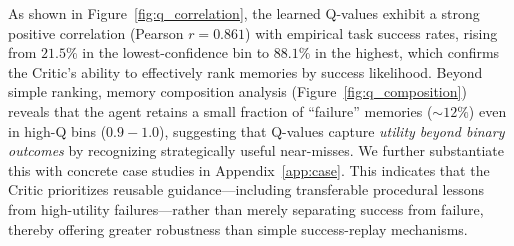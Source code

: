 \documentclass{article}
\theoremstyle{plain}
\theoremstyle{definition}
\theoremstyle{remark}
\begin{document}

As shown in Figure~\ref{fig:q_correlation}, the learned Q-values exhibit a strong positive correlation (Pearson $r=0.861$) with empirical task success rates, rising from $21.5\%$ in the lowest-confidence bin to $88.1\%$ in the highest, which confirms the Critic's ability to effectively rank memories by success likelihood. 
Beyond simple ranking, memory composition analysis (Figure~\ref{fig:q_composition}) reveals that the agent retains a small fraction of ``failure'' memories ($\sim12\%$) even in high-Q bins ($0.9-1.0$), suggesting that Q-values capture \emph{utility beyond binary outcomes} by recognizing strategically useful near-misses. 
We further substantiate this with concrete case studies in Appendix~\ref{app:case}.
This indicates that the Critic prioritizes reusable guidance---including transferable procedural lessons from high-utility failures---rather than merely separating success from failure, thereby offering greater robustness than simple success-replay mechanisms.


\end{document}
